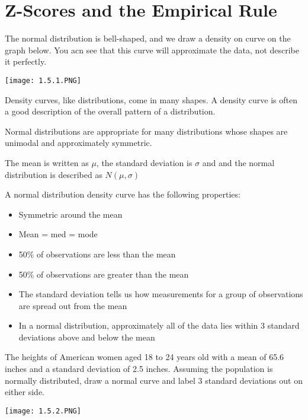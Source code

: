 \documentclass[../stats.tex]{subfiles}
\begin{document}
\section{Z-Scores and the Empirical Rule}
The normal distribution is bell-shaped, and we draw a density on curve on the graph below. You acn see that this curve will approximate the data, not describe it perfectly.
\begin{center}
    \texttt{[image: 1.5.1.PNG]}
\end{center}
Density curves, like distributions, come in many shapes. A density curve is often a good description of the overall pattern of a distribution.

Normal distributions are appropriate for many distributions whose shapes are unimodal and approximately symmetric.

The mean is written as $\mu$, the standard deviation is $\sigma$ and and the normal distribution is described as $N(\mu,\sigma)$

A normal distribution density curve has the following properties:
\begin{itemize}
    \item Symmetric around the mean 
    \item Mean = med = mode 
    \item 50\% of observations are less than the mean 
    \item 50\% of observations are greater than the mean 
    \item The standard deviation tells us how measurements for a group of observations are spread out from the mean 
    \item In a normal distribution, approximately all of the data lies within 3 standard deviations above and below the mean 
\end{itemize}

\begin{example}
    The heights of American women aged 18 to 24 years old with a mean of 65.6 inches and a standard deviation of 2.5 inches. Assuming the population is normally distributed, draw a normal curve and label 3 standard deviations out on either side.
    \begin{center}
        \texttt{[image: 1.5.2.PNG]}
    \end{center}
\end{example}
\end{document}
